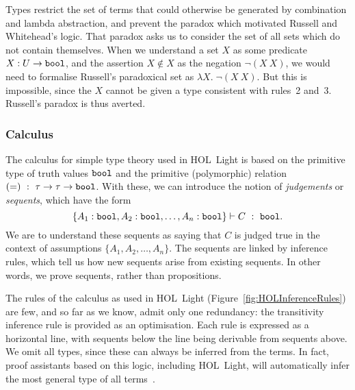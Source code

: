 Types restrict the set of terms that could otherwise be generated by combination and lambda abstraction, and prevent the paradox which motivated Russell and Whitehead's logic. That paradox asks us to consider the set of all sets which do not contain themselves. When we understand a set $X$ as some predicate $X:U \rightarrow \texttt{bool}$, and the assertion $X \not\in X$ as the negation $\neg(X\ X)$, we would need to formalise Russell's paradoxical set as $\lambda X.\; \neg(X\ X)$. But this is impossible, since the $X$ cannot be given a type consistent with rules~2 and~3. Russell's paradox is thus averted.

\subsubsection{Calculus}\label{sec:HOLInferenceRules}
The calculus for simple type theory used in HOL~Light is based on the primitive type of truth values $\texttt{bool}$ and the primitive (polymorphic) relation $(=)\ :\ \tau \rightarrow \tau \rightarrow \texttt{bool}$. With these, we can introduce the notion of \emph{judgements} or \emph{sequents}, which have the form
\begin{displaymath}
\{A_1:\texttt{bool},A_2:\texttt{bool},\ldots,A_n:\texttt{bool}\} \vdash C\ :\ \texttt{bool}.
\end{displaymath}
We are to understand these sequents as saying that $C$ is judged true in the context of assumptions $\{A_1,A_2,\ldots,A_n\}$. The sequents are linked by inference rules, which tell us how new sequents arise from existing sequents. In other words, we prove sequents, rather than propositions.

The rules of the calculus as used in HOL~Light (Figure~\ref{fig:HOLInferenceRules}) are few, and so far as we know, admit only one redundancy: the transitivity inference rule is provided as an optimisation. Each rule is expressed as a horizontal line, with sequents below the line being derivable from sequents above. We omit all types, since these can always be inferred from the terms. In fact, proof assistants based on this logic, including HOL~Light, will automatically infer the most general type of all terms~\cite{HindleyMilner}.

